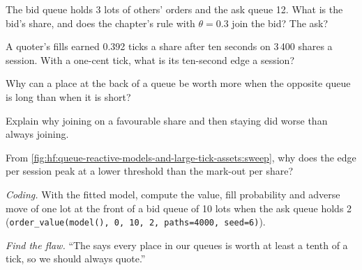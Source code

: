 \begin{exercise}[$\star$]\label{exo:hf:queue-reactive-models-and-large-tick-assets:2}
The bid queue holds 3 lots of others' orders and the ask queue 12. What is the bid's share, and does the chapter's rule with $\theta=0.3$ join the
bid? The ask?
\end{exercise}

\begin{exercise}[$\star$]\label{exo:hf:queue-reactive-models-and-large-tick-assets:3}
A quoter's fills earned 0.392 ticks a share after ten seconds on 3\,400 shares a session. With a one-cent tick, what is its ten-second edge a
session?
\end{exercise}

\begin{exercise}[$\star\star$]\label{exo:hf:queue-reactive-models-and-large-tick-assets:4}
Why can a place at the back of a queue be worth more when the opposite queue is long than when it is short?
\end{exercise}

\begin{exercise}[$\star\star$]\label{exo:hf:queue-reactive-models-and-large-tick-assets:5}
Explain why joining on a favourable share and then staying did worse than always joining.
\end{exercise}

\begin{exercise}[$\star\star$]\label{exo:hf:queue-reactive-models-and-large-tick-assets:6}
From \cref{fig:hf:queue-reactive-models-and-large-tick-assets:sweep}, why does the edge per session peak at a lower threshold than the mark-out
per share?
\end{exercise}

\begin{exercise}[$\star\star\star$]\label{exo:hf:queue-reactive-models-and-large-tick-assets:7}
\emph{Coding.} With the fitted model, compute the value, fill probability and adverse move of one lot at the front of a bid queue of 10 lots when
the ask queue holds 2 (\texttt{order\_value(model(), 0, 10, 2, paths=4000, seed=6)}).
\end{exercise}

\begin{exercise}[$\star\star\star$]\label{exo:hf:queue-reactive-models-and-large-tick-assets:8}
\emph{Find the flaw.} ``The  says every place in our queues is worth at least a tenth of a tick, so we should always quote.''
\end{exercise}

